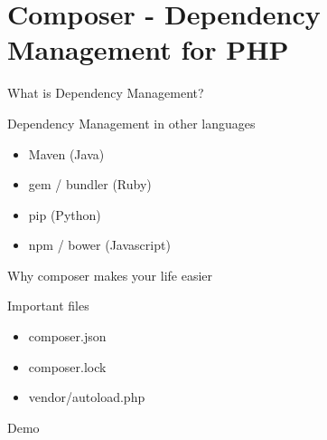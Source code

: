 \section{Composer - Dependency Management for PHP}

\begin{frame}{What is Dependency Management?}
\end{frame}

\begin{frame}{Dependency Management in other languages}
	\begin{itemize}
		\item Maven (Java)
		\item gem / bundler (Ruby)
		\item pip (Python)
		\item npm / bower (Javascript)
	\end{itemize}
\end{frame}

\begin{frame}{Why composer makes your life easier}
\end{frame}

\begin{frame}{Important files}
	\begin{itemize}
		\item composer.json
		\item composer.lock
		\item vendor/autoload.php
	\end{itemize}
\end{frame}

\begin{frame}[standout]
	Demo
\end{frame}